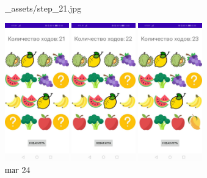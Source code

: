 \documentclass[12pt, a4paper, simple]{eskdtext}
\begin{document}
\begin{figure}[!h]
\begin{minipage}{0.15\textwidth}
                {_assets/step_21.jpg}
            \caption{шаг 21}
            \label{fig:step_21}
        \end{minipage}
        \begin{minipage}{0.15\textwidth}
            \centering
            \includegraphics[height=6cm]
                {_assets/step_22.jpg}
            \caption{шаг 22}
            \label{fig:step_22}
        \end{minipage}
        \begin{minipage}{0.15\textwidth}
            \centering
            \includegraphics[height=6cm]
                {_assets/step_23.jpg}
            \caption{шаг 23}
            \label{fig:step_23}
        \end{minipage}
        \begin{minipage}{0.15\textwidth}
            \centering
            \includegraphics[height=6cm]
                {_assets/step_24.jpg}
            \caption{шаг 24}
            \label{fig:step_24}
        \end{minipage}
    \end{figure}
\end{document}
